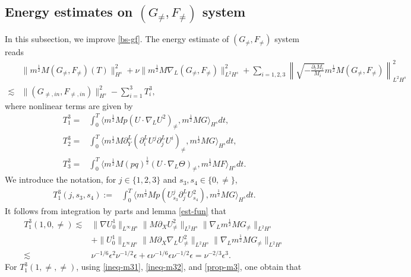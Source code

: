 \documentclass[12pt]{article}
\numberwithin{equation}{section}
\begin{document}
	\subsection{Energy estimates on $(G_{\neq},F_{\neq})$ system}
	In this subsection, we improve \eqref{bs-gf}. The energy estimate of $(G_{\neq},F_{\neq})$ system reads
	\begin{align*}
		&\|m^{\frac{1}{2}}M(G_{\neq},F_{\neq})(T)\|^2_{H^s}+ \nu \|m^{\frac{1}{2}}M\nabla_L(G_{\neq},F_{\neq})\|^2_{L^2H^s}+\sum_{i=1,2,3}\left \|\sqrt{-\frac{\partial_t M_i}{M_i}}m^{\frac{1}{2}}M(G_{\neq},F_{\neq})\right\|^2_{L^2H^s} \\
		\lesssim& \|(G_{\neq,in},F_{\neq,in})\|^2_{H^s}- \sum_{i=1}^{3}T^{3}_i,
	\end{align*}
	where nonlinear terms are given by
	\begin{align*}
		T^3_1=&\int_{0}^{T}\langle m^{\frac{1}{2}}Mp(U\cdot\nabla_L U^2)_{\neq},m^{\frac{1}{2}}MG\rangle_{H^s} dt,\\
		T^3_2=&\int_{0}^{T}\langle m^{\frac{1}{2}}M\partial_Y^L(\partial^L_i U^j \partial^L_j U^i)_{\neq},m^{\frac{1}{2}}MG\rangle_{H^s} dt,\\
		T^3_3=&\int_{0}^{T}\langle m^{\frac{1}{2}}M(pq)^{\frac{1}{2}}(U\cdot\nabla_L \Theta)_{\neq},m^{\frac{1}{2}}MF\rangle_{H^s} dt.
	\end{align*}
	We introduce the notation, for $j\in\{1,2,3\}$ and $s_3,s_4\in\{0,\neq \}$,
	\begin{align*}
		T^3_1(j,s_3,s_4):=&\int_{0}^{T}\langle m^{\frac{1}{2}}Mp(U^j_{s_3}\partial_j^L U^2_{s_4}),m^{\frac{1}{2}}MG\rangle_{H^s} dt.
	\end{align*}
	It follows from integration by parts and lemma \ref{est-fun} that
	\begin{align*}
		T^3_1(1,0,\neq)\lesssim&\|\nabla U^1_0\|_{L^\infty H^s}\|M\partial_XU^2_{\neq}\|_{L^2H^s}\|\nabla_L m^{\frac{1}{2}}MG_{\neq}\|_{L^2H^s}\\
		&+\|U^1_0\|_{L^\infty H^s}\|M\partial_X\nabla_LU^2_{\neq}\|_{L^2H^s}\|\nabla_L m^{\frac{1}{2}}MG_{\neq}\|_{L^2H^s}\\
		\lesssim&\nu^{-1/6}\epsilon^2\nu^{-1/2}\epsilon+\epsilon\nu^{-1/6}\epsilon\nu^{-1/2}\epsilon=\nu^{-2/3}\epsilon^3.
	\end{align*}
    For $T^{3}_1(1,\neq,\neq)$, using \eqref{ineq-m31}, \eqref{ineq-m32}, and \eqref{prop-m3}, one obtain that
\end{document}
